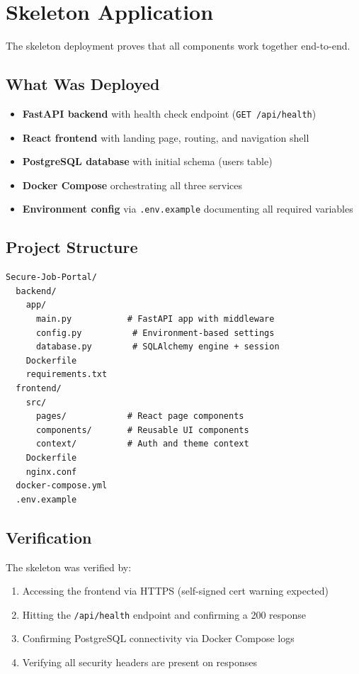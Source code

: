 \documentclass[12pt, a4paper]{article}
\begin{document}
\section{Skeleton Application}

The skeleton deployment proves that all components work together end-to-end.

\subsection{What Was Deployed}

\begin{itemize}
    \item \textbf{FastAPI backend} with health check endpoint (\texttt{GET /api/health})
    \item \textbf{React frontend} with landing page, routing, and navigation shell
    \item \textbf{PostgreSQL database} with initial schema (users table)
    \item \textbf{Docker Compose} orchestrating all three services
    \item \textbf{Environment config} via \texttt{.env.example} documenting all required variables
\end{itemize}

\subsection{Project Structure}

\begin{lstlisting}
Secure-Job-Portal/
  backend/
    app/
      main.py           # FastAPI app with middleware
      config.py          # Environment-based settings
      database.py        # SQLAlchemy engine + session
    Dockerfile
    requirements.txt
  frontend/
    src/
      pages/            # React page components
      components/       # Reusable UI components
      context/          # Auth and theme context
    Dockerfile
    nginx.conf
  docker-compose.yml
  .env.example
\end{lstlisting}

\subsection{Verification}

The skeleton was verified by:
\begin{enumerate}
    \item Accessing the frontend via HTTPS (self-signed cert warning expected)
    \item Hitting the \texttt{/api/health} endpoint and confirming a 200 response
    \item Confirming PostgreSQL connectivity via Docker Compose logs
    \item Verifying all security headers are present on responses
\end{enumerate}
\end{document}
